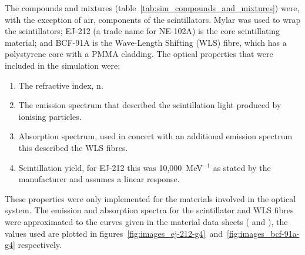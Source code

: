 The compounds and mixtures (table~\ref{tab:sim_compounds_and_mixtures}) were, with the exception of air, components of the scintillators. Mylar was used to wrap the scintillators; EJ-212 (a trade name for NE-102A) is the core scintillating material; and BCF-91A is the Wave-Length Shifting (WLS) fibre, which has a polystyrene core with a PMMA cladding. The optical properties that were included in the simulation were:
\begin{enumerate}
  \item The refractive index, n.
  \item The emission spectrum that described the scintillation light produced by ionising particles.
  \item Absorption spectrum, used in concert with an additional emission spectrum this described the WLS fibres.
  \item Scintillation yield, for EJ-212 this was 10,000~MeV\(^{-1}\) as stated by the manufacturer and assumes a linear response.
\end{enumerate}
These properties were only implemented for the materials involved in the optical system. The emission and absorption spectra for the scintillator and WLS fibres were approximated to the curves given in the material data sheets (\cite{EJ_212} and \cite{BCF_91A}), the values used are plotted in  figures~\ref{fig:images_ej-212-g4}~and~\ref{fig:images_bcf-91a-g4} respectively.

